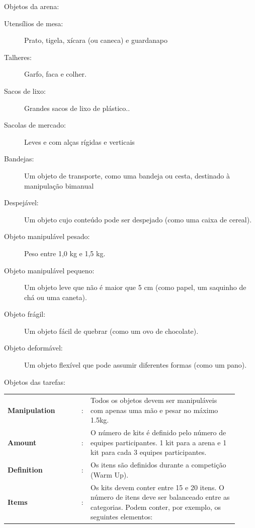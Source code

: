 \documentclass[11pt, twoside, openright, a4paper, chapterprefix]{article}
\begin{document}
Objetos da arena:
\begin{description}
    \item [Utensílios de mesa:] Prato, tigela, xícara (ou caneca) e guardanapo
    \item [Talheres:] Garfo, faca e colher.
    \item [Sacos de lixo:] Grandes sacos de lixo de plástico..
    \item [Sacolas de mercado:] Leves e com alças rígidas e verticais
    \item [Bandejas:] Um objeto de transporte, como uma bandeja ou cesta, destinado à manipulação bimanual
    \item [Despejável:] Um objeto cujo conteúdo pode ser despejado (como uma caixa de cereal).
    \item [Objeto manipulável pesado:] Peso entre 1,0 kg e 1,5 kg.
    \item [Objeto manipulável pequeno:] Um objeto leve que não é maior que 5 cm (como papel, um saquinho de chá ou uma caneta).
    \item [Objeto frágil:] Um objeto fácil de quebrar (como um ovo de chocolate).
    \item [Objeto deformável:] Um objeto flexível que pode assumir diferentes formas (como um pano).
\end{description}


Objetos das tarefas:
\begin{tabular}{ p{0.3\linewidth} p{0.01\linewidth} p{0.6\linewidth}}
    \textbf{Manipulation}       & : & Todos os objetos devem ser manipuláveis com apenas uma mão e pesar no máximo 1.5kg. \\
    \textbf{Amount}             & : & O número de kits é definido pelo número de equipes participantes. 1 kit para a arena e 1 kit para cada 3 equipes participantes. \\
    \textbf{Definition}         & : & Os itens são definidos durante a competição (Warm Up). \\
    \textbf{Items}              & : & Os kits devem conter entre 15 e 20 itens. O número de itens deve ser balanceado entre as categorias. Podem conter, por exemplo, os seguintes elementos: 
\end{tabular}
\end{document}
